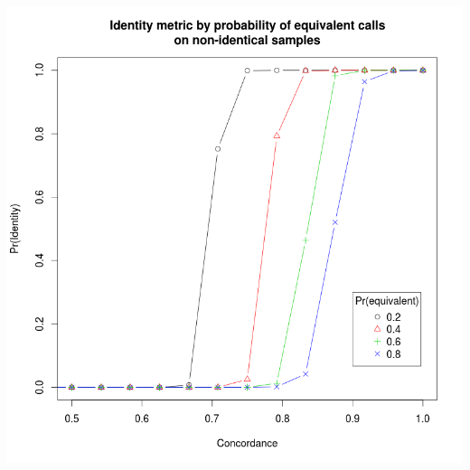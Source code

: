 \documentclass{article}
\begin{document}
\includegraphics[scale=0.5]{identity_by_eq_prob.png}
\end{document}

